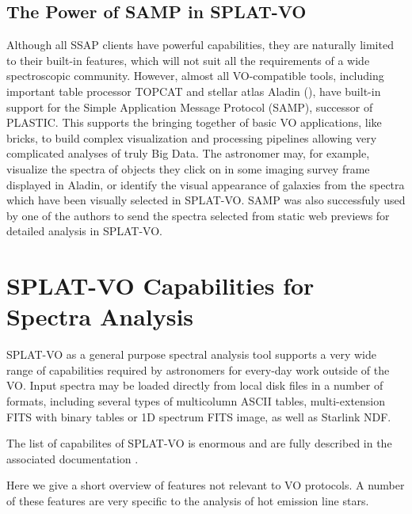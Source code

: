 \documentclass[final,authoryear,5p,times,twocolumn]{elsarticle}
\begin{document}

\subsection{The Power of SAMP in SPLAT-VO}

Although all SSAP clients have powerful capabilities, they are naturally
limited to their built-in features, which will not suit all the requirements
of a wide spectroscopic community. However, almost all VO-compatible tools,
including important table processor TOPCAT and stellar atlas Aladin
(), have built-in support for the Simple Application Message
Protocol (SAMP), successor of PLASTIC. This supports the bringing together of
basic VO applications, like bricks, to build complex visualization and
processing pipelines allowing very complicated analyses of truly Big Data.
The astronomer may, for example, visualize the spectra of objects they click
on in some imaging survey frame displayed in Aladin, or identify the visual
appearance of galaxies from the spectra which have been visually selected in
SPLAT-VO.  SAMP was also successfuly used by one of the authors to send the
spectra selected from static web previews for detailed analysis in SPLAT-VO.


\section{SPLAT-VO Capabilities  for Spectra Analysis}

SPLAT-VO as a general purpose spectral analysis tool supports a very wide
range of capabilities required by astronomers for every-day work outside of
the VO. Input spectra may be loaded directly from local disk files in a number
of formats, including several types of multicolumn ASCII tables,
multi-extension FITS with binary tables or 1D spectrum FITS image, as well as
Starlink NDF.

The list of capabilites of SPLAT-VO is enormous and are fully described in
the associated documentation \citep[SUN/243;][]{sun243}.

Here we give a short overview of features not relevant to VO protocols. A
number of these features are very specific to the analysis of hot emission
line stars.
\end{document}

